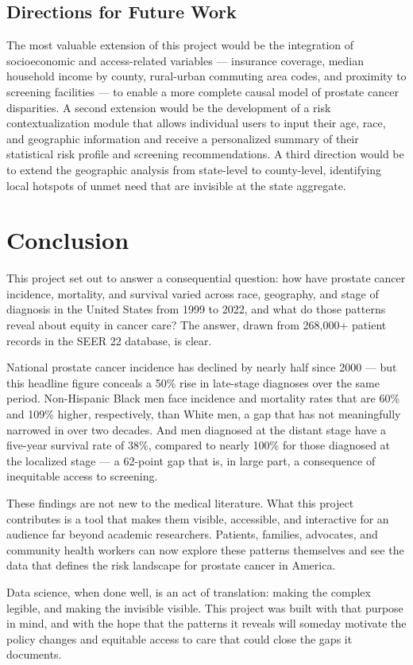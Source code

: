 \subsection{Directions for Future Work}

The most valuable extension of this project would be the integration of
socioeconomic and access-related variables --- insurance coverage, median household
income by county, rural-urban commuting area codes, and proximity to screening
facilities --- to enable a more complete causal model of prostate cancer disparities.
A second extension would be the development of a risk contextualization module that
allows individual users to input their age, race, and geographic information and
receive a personalized summary of their statistical risk profile and screening
recommendations. A third direction would be to extend the geographic analysis from
state-level to county-level, identifying local hotspots of unmet need that are
invisible at the state aggregate.

\section{Conclusion}

This project set out to answer a consequential question: how have prostate cancer
incidence, mortality, and survival varied across race, geography, and stage of
diagnosis in the United States from 1999 to 2022, and what do those patterns reveal
about equity in cancer care? The answer, drawn from 268,000+ patient records in the
SEER 22 database, is clear.

National prostate cancer incidence has declined by nearly half since 2000 --- but
this headline figure conceals a 50\% rise in late-stage diagnoses over the same
period. Non-Hispanic Black men face incidence and mortality rates that are 60\% and
109\% higher, respectively, than White men, a gap that has not meaningfully narrowed
in over two decades. And men diagnosed at the distant stage have a five-year survival
rate of 38\%, compared to nearly 100\% for those diagnosed at the localized stage ---
a 62-point gap that is, in large part, a consequence of inequitable access to
screening.

These findings are not new to the medical literature. What this project contributes
is a tool that makes them visible, accessible, and interactive for an audience far
beyond academic researchers. Patients, families, advocates, and community health
workers can now explore these patterns themselves and see the data that defines the
risk landscape for prostate cancer in America.

Data science, when done well, is an act of translation: making the complex legible,
and making the invisible visible. This project was built with that purpose in mind,
and with the hope that the patterns it reveals will someday motivate the policy
changes and equitable access to care that could close the gaps it documents.

\newpage
\singlespacing




